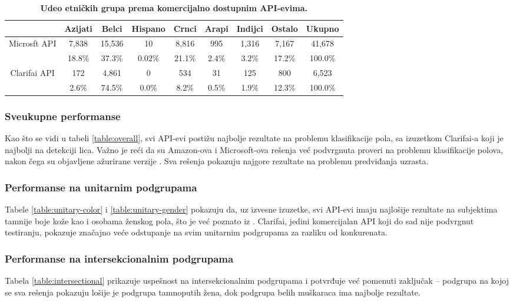 \documentclass[11pt, a4paper]{article}
\begin{document}
\begin{table}[h!]
	\centering
	\caption{\textbf{Udeo etničkih grupa prema komercijalno dostupnim API-evima.}}
	\begin{adjustbox}{width=\textwidth}
	\begin{tabular}{c|cccccccc} \toprule
		{} & {Azijati} & {Belci} & {Hispano} & {Crnci} & {Arapi} & {Indijci} & {Ostalo} & {Ukupno} \\ \midrule
		{Microsft API} & 7,838 & 15,536 & 10 & 8,816 & 995 & 1,316 & 7,167 & 41,678 \\
		{} & 18.8\% & 37.3\% & 0.02\% & 21.1\% & 2.4\% & 3.2\% & 17.2\% & 100.0\% \\ \midrule
		{Clarifai API} & 172 & 4,861 & 0 & 534 & 31 & 125 & 800 & 6,523 \\
		{} & 2.6\% & 74.5\% & 0.0\% & 8.2\% & 0.5\% & 1.9\% & 12.3\% & 100.0\% \\ \bottomrule
	\end{tabular}
	\end{adjustbox}
	\label{table:ethnicity-api}
\end{table}

\subsubsection{Sveukupne performanse} Kao što se vidi u tabeli \ref{table:overall}, svi API-evi postižu najbolje rezultate na problemu klasifikacije pola, sa izuzetkom Clarifai-a koji je najbolji na detekciji lica. Važno je reći da su Amazon-ova i Microsoft-ova rešenja već podvrgnuta proveri na problemu klasifikacije polova, nakon čega su objavljene ažurirane verzije \cite{G6, G39}. Sva rešenja pokazuju najgore rezultate na problemu predviđanja uzrasta.

\subsubsection{Performanse na unitarnim podgrupama} Tabele \ref{table:unitary-color} i \ref{table:unitary-gender} pokazuju da, uz izvesne izuzetke, svi API-evi imaju najlošije rezultate na subjektima tamnije boje kože kao i osobama ženskog pola, što je već poznato iz \cite{G6}. Clarifai, jedini komercijalan API koji do sad nije podvrgnut testiranju, pokazuje značajno veće odstupanje na svim unitarnim podgrupama za razliku od konkurenata.

\subsubsection{Performanse na intersekcionalnim podgrupama} Tabela \ref{table:intersectional} prikazuje uspešnost na intersekcionalnim podgrupama i potvrđuje već pomenuti zaključak -- podgrupa na kojoj se sva rešenja pokazuju lošije je podgrupa tamnoputih žena, dok podgrupa belih muškaraca ima najbolje rezultate.
\end{document}
